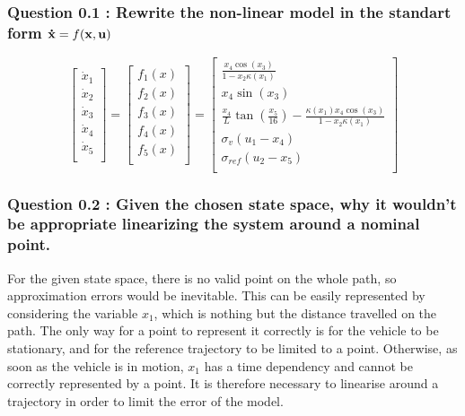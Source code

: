 \subsubsection*{Question 0.1 : Rewrite the non-linear model in the standart form $\bold{\dot{x}} = f(\bold{x}, \bold{u})$}
\begin{equation}
    \left[ {\begin{array}{c}
        \dot{x}_1\\
        \dot{x}_2\\
        \dot{x}_3\\
        \dot{x}_4\\
        \dot{x}_5\\
    \end{array} } \right]
    =
    \left[ {\begin{array}{c}
        f_1(x)\\
        f_2(x)\\
        f_3(x)\\
        f_4(x)\\
        f_5(x)\\
    \end{array} } \right] 
    =
    \left[ {\begin{array}{c}
        \frac{x_4 \cos(x_3)}{1 - x_2\kappa(x_1)}\\
        x_4 \sin(x_3)\\
        \frac{x_4}{L}\tan(\frac{x_5}{16}) - \frac{\kappa(x_1) x_4 \cos(x_3)}{1 - x_2 \kappa(x_1)}\\
        \sigma_v (u_1 - x_4)\\
        \sigma_{ref} (u_2 - x_5)\\
    \end{array} } \right]
\end{equation}



\subsubsection*{Question 0.2 : Given the chosen state space, why it wouldn’t be appropriate linearizing the system around a nominal point.}

For the given state space, there is no valid point on the whole path, so approximation errors would be inevitable. This can be easily represented by considering the variable $x_1$, which is nothing but the distance travelled on the path. The only way for a point to represent it correctly is for the vehicle to be stationary, and for the reference trajectory to be limited to a point. Otherwise, as soon as the vehicle is in motion, $x_1$ has a time dependency and cannot be correctly represented by a point. It is therefore necessary to linearise around a trajectory in order to limit the error of the model.



